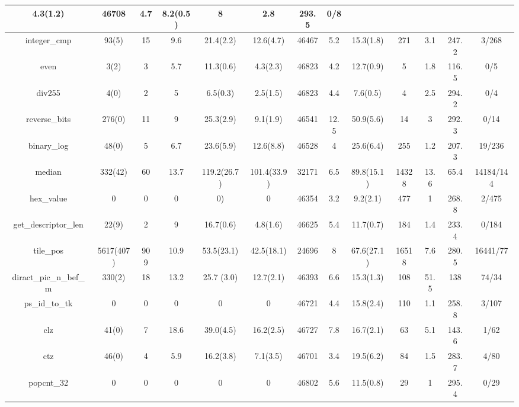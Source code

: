 \begin{table*}
\begin{tabular}{@{}c@{}c@{\hspace{0.2mm}}c@{\hspace{0.2mm}}cccccccccc@{}}
		4.3(1.2) & 46708 & 4.7 & 8.2(0.5) & 8 & 2.8 & 293.5 & 0/8 \\
		\midrule
		\multicolumn{1}{c}{integer\_cmp} & 93(5) & 15 & 9.6 & 21.4(2.2) &
		12.6(4.7) & 46467 & 5.2 & 15.3(1.8) & 271 & 3.1 & 247.2 & 3/268 \\
		\midrule
		\multicolumn{1}{c}{even} & 3(2) & 3 & 5.7 & 11.3(0.6) & 4.3(2.3) &
		46823 & 4.2 & 12.7(0.9) & 5 & 1.8 & 116.5 & 0/5 \\ \midrule
		\multicolumn{1}{c}{div255} & 4(0) & 2 & 5 & 6.5(0.3) & 2.5(1.5) &
		46823 & 4.4 & 7.6(0.5) & 4 & 2.5 & 294.2 & 0/4 \\ \midrule
		\multicolumn{1}{c}{reverse\_bits} & 276(0) & 11 & 9 & 25.3(2.9) &
		9.1(1.9) & 46541 & 12.5 & 50.9(5.6) & 14 & 3 & 292.3 & 0/14 \\
		\midrule
		\multicolumn{1}{c}{binary\_log} & 48(0) & 5 & 6.7 & 23.6(5.9) &
		12.6(8.8) & 46528 & 4 & 25.6(6.4) & 255 & 1.2 & 207.3 & 19/236 \\
		\midrule
		\multicolumn{1}{c}{median} & 332(42) & 60 & 13.7 & 119.2(26.7) &
		101.4(33.9) & 32171 & 6.5 & 89.8(15.1) & 14328 & 13.6 & 65.4 &
		14184/144 \\ \midrule
		\multicolumn{1}{c}{hex\_value} & 0 & 0 & 0 & 0) & 0 & 46354 & 3.2
		& 9.2(2.1) & 477 & 1 & 268.8 & 2/475 \\ \midrule
		\multicolumn{1}{c}{get\_descriptor\_len} & 22(9) & 2 & 9 &
		16.7(0.6) & 4.8(1.6) & 46625 & 5.4 & 11.7(0.7) & 184 & 1.4 & 233.4 &
		0/184 \\ \midrule
		\multicolumn{1}{c}{tile\_pos} & \hspace{0.2mm} 5617(407) & 909 & 10.9 &
		53.5(23.1) & 42.5(18.1) & 24696 & 8 & 67.6(27.1) & 16518 & 7.6 &
		280.5 & 16441/77 \\ \midrule
		\multicolumn{1}{c}{diract\_pic\_n\_bef\_m} & 330(2) & 18 & 13.2 &
		25.7 (3.0) & 12.7(2.1) & 46393 & 6.6 & 15.3(1.3) & 108 & 51.5 & 138
		& 74/34 \\ \midrule
		\multicolumn{1}{c}{ps\_id\_to\_tk} & 0 & 0 & 0 & 0 & 0 & 46721 &
		4.4 & 15.8(2.4) & 110 & 1.1 & 258.8 & 3/107 \\ \midrule
		\multicolumn{1}{c}{clz} & 41(0) & 7 & 18.6 & 39.0(4.5) & 16.2(2.5)
		& 46727 & 7.8 & 16.7(2.1) & 63 & 5.1 & 143.6 & 1/62 \\ \midrule
		\multicolumn{1}{c}{ctz} & 46(0) & 4 & 5.9 & 16.2(3.8) & 7.1(3.5) &
		46701 & 3.4 & 19.5(6.2) & 84 & 1.5 & 283.7 & 4/80 \\ \midrule
		\multicolumn{1}{c}{popcnt\_32} & 0 & 0 & 0 & 0 & 0 & 46802 & 5.6 &
		11.5(0.8) & 29 & 1 & 295.4 & 0/29 \\ \midrule

\end{tabular}
\end{table*}
